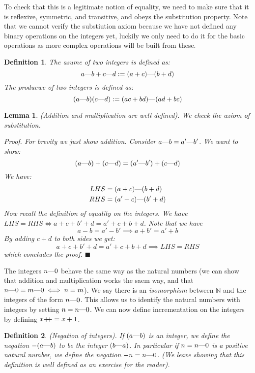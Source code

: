 \documentclass{article}
\newtheorem{definition}{Definition}[subsection]
\newtheorem{lemma}{Lemma}[subsection]
\newcommand{\N}{\mathbb{N}}
\newcommand{\mem}{\text{\textemdash}} %
\newcommand{\pp}{\mathbin{+\mkern-5mu+}}
\let\it\textit
\begin{document}
To check that this is a legitimate notion of equality, we need 
to make sure that it is reflexive, symmetric, and transitive, and 
obeys the substitution property. Note that we cannot verify the 
substiution axiom because we have not defined any binary operations
on the integers yet, luckily we only need to do it for the basic
operations as more complex operations will be built from these.

\begin{definition}
	The asume of two integers is defined as: 
	$$
	a \mem b + c \mem d := (a + c) \mem (b + d)
	$$
	The producwe of two integers is defined as: 
	$$
	(a\mem b)(c\mem d) := (ac + bd) \mem (ad + bc)
	$$
\end{definition}

\begin{lemma}
	(Addition and multiplication are well defined). We check 
	the axiom of substitution. 

	\it{Proof}. For brevity we just show addition. Consider 
	$a \mem b = a' \mem b'$. We want to show:
	$$
	(a \mem b) + (c \mem d) = (a' \mem b') + (c \mem d)
	$$
	We have: 
	\begin{align*}
		LHS &= (a+c)\mem (b + d) \\	
		RHS &= (a' + c) \mem (b' + d)
	\end{align*}
	Now recall the definition of equality on the integers. We have 
	$LHS = RHS  \iff a+c + b'+d = a' + c + b + d$. Note that we have
	$$
	a - b = a' -b' \implies a + b' = a' + b
	$$
	By adding $c+d$ to both sides we get:
	$$
	a + c + b' +d = a' + c + b +d \implies LHS = RHS
	$$
	which concludes the proof. \hfill $\blacksquare$
\end{lemma}

The integers $n\mem 0$ behave the same way as the natural numbers
(we can show that addition and multiplication works the saem way,
and that $n\mem 0 = m \mem 0 \\ \iff n = m$). We say there is 
an \it{isomorphism} between $\N$ and the integers of the form $n\mem 0$.
This allows us to identify the natural numbers with integers by 
setting $n = n\mem 0$. We can now define incrementation on the integers 
by defining $x \pp = x+1$. 

\begin{definition}
	(Negation of integers). If $(a\mem b)$ is an integer, we define
	the negation $-(a\mem b)$ to be the integer $(b\mem a)$.
	In particular if $n = n \mem 0$ is a positive natural number, 
	we define the negation $-n = n\mem 0$. (We leave showing 
	that this definition is well defined as an exercise for the 
	reader).
\end{definition}
\end{document}
